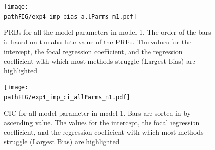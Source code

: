 \documentclass[11pt]{article}
\newcommand{\pathFIG}{../../output/graphs}
\begin{document}
\begin{figure}
	\centering
	\texttt{[image: \\pathFIG/exp4\_imp\_bias\_allParms\_m1.pdf]}
	\caption{PRBs for all the model parameters in model 1. 
		The order of the bars is based on the absolute value of the PRBs.
		The values for the intercept, the focal regression coefficient, and the regression coefficient with which most 
		methods struggle (Largest Bias) are highlighted}
	\label{fig:exp4_bias_allP}
\end{figure}

\begin{figure}
	\centering
	\texttt{[image: \\pathFIG/exp4\_imp\_ci\_allParms\_m1.pdf]}
	\caption{CIC for all model parameter in model 1.
		Bars are sorted in by ascending value.
		The values for the intercept, the focal regression coefficient, and the regression coefficient with which most 
		methods struggle (Largest Bias) are highlighted}
	\label{fig:exp4_ci_allP}
\end{figure}
\end{document}
